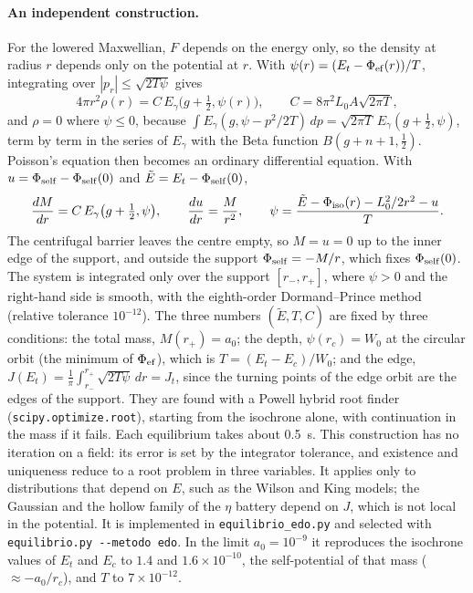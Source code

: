\documentclass[11pt,a4paper]{article}
\begin{document}
\paragraph{An independent construction.}
\label{sec:edo}
For the lowered Maxwellian, $F$ depends on the energy only, so the density at radius $r$
depends only on the potential at $r$. With $\psi(r)=(E_t-\Phi_{\rm ef}(r))/T$, integrating over
$|p_r|\le\sqrt{2T\psi}$ gives
\[
  4\pi r^2\rho(r)=C\,E_\gamma\big(g+\tfrac12,\psi(r)\big),\qquad C=8\pi^2L_0A\sqrt{2\pi T},
\]
and $\rho=0$ where $\psi\le0$, because
$\int E_\gamma(g,\psi-p^2/2T)\,dp=\sqrt{2\pi T}\,E_\gamma(g+\tfrac12,\psi)$, term by term in the series
of $E_\gamma$ with the Beta function $B(g+n+1,\tfrac12)$. Poisson's equation then becomes an
ordinary differential equation. With $u=\Phi_{\rm self}-\Phi_{\rm self}(0)$ and
$\tilde E=E_t-\Phi_{\rm self}(0)$,
\[
  \frac{dM}{dr}=C\,E_\gamma\big(g+\tfrac12,\psi\big),\qquad \frac{du}{dr}=\frac{M}{r^2},\qquad
  \psi=\frac{\tilde E-\Phi_{\rm iso}(r)-L_0^2/2r^2-u}{T}.
\]
The centrifugal barrier leaves the centre empty, so $M=u=0$ up to the inner edge of the
support, and outside the support $\Phi_{\rm self}=-M/r$, which fixes $\Phi_{\rm self}(0)$. The system
is integrated only over the support $[r_-,r_+]$, where $\psi>0$ and the right-hand side is
smooth, with the eighth-order Dormand--Prince method (relative tolerance $10^{-12}$). The
three numbers $(\tilde E,T,C)$ are fixed by three conditions: the total mass,
$M(r_+)=a_0$; the depth, $\psi(r_c)=W_0$ at the circular orbit (the minimum of $\Phi_{\rm ef}$),
which is $T=(E_t-E_c)/W_0$; and the edge, $J(E_t)=\frac1\pi\int_{r_-}^{r_+}\sqrt{2T\psi}\,dr=J_t$,
since the turning points of the edge orbit are the edges of the support. They are found
with a Powell hybrid root finder (\texttt{scipy.optimize.root}), starting from the isochrone
alone, with continuation in the mass if it fails. Each equilibrium takes about
\SI{0.5}{s}. This construction has no iteration on a field: its error is set by the
integrator tolerance, and existence and uniqueness reduce to a root problem in three
variables. It applies only to distributions that depend on $E$, such as the Wilson and
King models; the Gaussian and the hollow family of the $\eta$ battery depend on $J$, which
is not local in the potential. It is implemented in \texttt{equilibrio\_\allowbreak edo.py}
and selected with \texttt{equilibrio.py -{}-metodo edo}. In the limit $a_0=10^{-9}$ it
reproduces the isochrone values of $E_t$ and $E_c$ to $1.4$ and $1.6\times10^{-10}$, the
self-potential of that mass ($\approx-a_0/r_c$), and $T$ to $7\times10^{-12}$.
\end{document}
